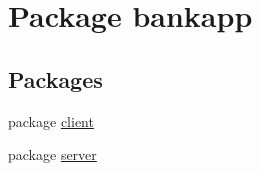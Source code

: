 \hypertarget{namespacebankapp}{}\section{Package bankapp}
\label{namespacebankapp}
\subsection*{Packages}
\begin{DoxyCompactItemize}
\item 
package \hyperlink{namespacebankapp_1_1client}{client}
\item 
package \hyperlink{namespacebankapp_1_1server}{server}
\end{DoxyCompactItemize}
